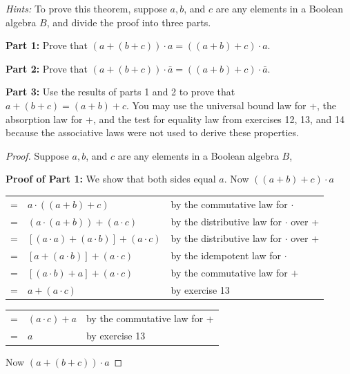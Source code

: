 \documentclass[14pt]{extarticle}
\newcommand{\cy}{\color{cyan}}
\begin{document}
{\it Hints:} To prove this theorem, suppose $a, b$, and $c$ are any elements in a Boolean algebra $B$, and divide the 
proof into three parts. 

{\bf Part 1:} Prove that \((a + (b + c)) \cdot a = ((a + b) + c) \cdot a\). 

{\bf Part 2:} Prove that \((a + (b + c)) \cdot \bar{a} = ((a + b) + c) \cdot \bar{a}\). 

{\bf Part 3:} Use the results of parts 1 and 2 to prove that \(a + (b + c) = (a + b) + c\). You may use the 
universal bound law for +, the absorption law for +, and the test for equality law from exercises 12, 13, and 14 
because the associative laws were not used to derive these properties.

\begin{proof}
Suppose $a, b$, and $c$ are any elements in a Boolean algebra $B$,

{\bf Proof of Part 1:} We show that both sides equal $a$.
Now \(((a + b) + c) \cdot a\)

\begin{center}
\begin{tabular}{cll}
= & \(a \cdot ((a + b) + c)\) & {\cy by the commutative law for $\cdot$} \\
= & \((a \cdot (a + b)) + (a \cdot c)\) & {\cy by the distributive law for $\cdot$ over +} \\
= & \([(a \cdot a) + (a \cdot b)] + (a \cdot c)\) & {\cy by the distributive law for $\cdot$ over +} \\
= & \([a + (a \cdot b)] + (a \cdot c)\) & {\cy by the idempotent law for $\cdot$} \\
= & \([(a \cdot b) + a] + (a \cdot c)\) & {\cy by the commutative law for $+$} \\
= & \(a + (a \cdot c)\) & {\cy by exercise 13} \\
\end{tabular}
\end{center}
\begin{center}
\begin{tabular}{cll}
= & \((a \cdot c) + a\) & {\cy by the commutative law for +} \\
= & \(a\) & {\cy by exercise 13}
\end{tabular}
\end{center}

Now \((a + (b + c)) \cdot a\)


\end{proof}
\end{document}
